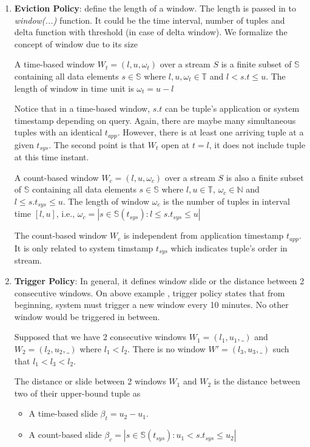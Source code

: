 \begin{enumerate}

\item \textbf{Eviction Policy}: define the length of a window. The length is passed in to \textit{window(...)} function. It could be the time interval, number of tuples and delta function with threshold (in case of delta window).
We formalize the concept of window due to its size

\begin{defi}
A time-based window $W_{t} = (l,u,\omega_t)$ over a stream $S$ is a finite subset of  $\mathbb{S}$ containing all data elements $s \in \mathbb{S}$ where $l , u, \omega_t \in \mathbb{T}$ and $l < s.t \leq u$. The length of window in time unit is $\omega_t = u-l$
\end{defi}
Notice that in a time-based window, $s.t$ can be tuple's application or system timestamp depending on query. Again, there are maybe many simultaneous tuples with an identical $t_{app}$. However, there is at least one arriving tuple at a given $t_{sys}$. The second point is that $W_t$ open at $t = l$, it does not include tuple at this time instant.

\begin{defi}
A count-based window $W_{c} = (l,u,\omega_c)$ over a stream $S$ is also a finite subset of  $\mathbb{S}$ containing all data elements $s \in \mathbb{S}$ where $l,u \in \mathbb{T}$, $\omega_c \in \mathbb{N}$ and $l \leq s.t_{sys} \leq u$. The length of window $\omega_c$ is the number of tuples in interval time $[l, u]$, i.e., $\omega_c = | {s \in \mathbb{S}(t_{sys}): l \leq s.t_{sys} \leq u}|$
\end{defi}
The count-based window $W_{c}$ is independent from application timestamp $t_{app}$. It is only related to system timstamp $t_{sys}$ which indicates tuple's order in stream. 


\item \textbf{Trigger Policy}: In general, it defines window slide or the distance between 2 consecutive windows. On above example , trigger policy states that from beginning, system must trigger a new window every 10 minutes. No other window would be triggered in between.

Supposed that we have 2 consecutive windows $W_1 = (l_1, u_1, \_)$ and $W_2 = (l_2, u_2, \_)$  where $l_1 < l_2$. There is no window $W' = (l_3, u_3, \_)$ such that $l_1< l_3 < l_2$.
\begin{defi}
The distance or slide between 2 windows $W_1$ and $W_2$ is the distance between two of their upper-bound tuple as
\begin{itemize}


\item  A time-based slide $\beta_{t} = u_2 - u_1$.  
\item A count-based slide $\beta_{c} = |{s \in \mathbb{S}(t_{sys}): u_1 < s.t_{sys} \leq u_2}| $ 

\end{itemize}

\end{defi}

\end{enumerate}

